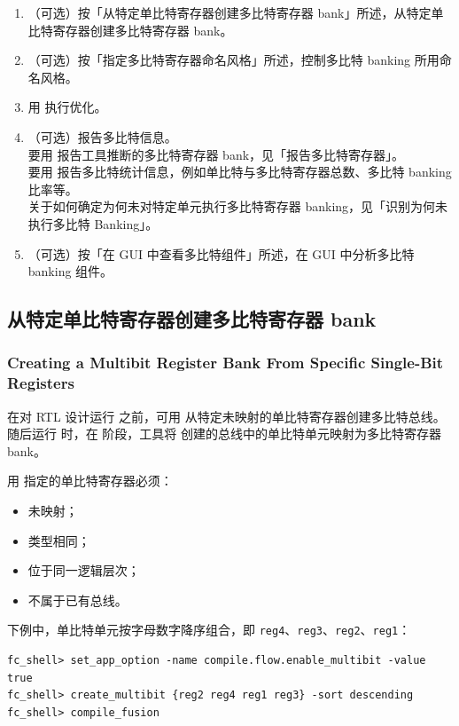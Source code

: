 \begin{enumerate}
  \item （可选）按「从特定单比特寄存器创建多比特寄存器 bank」所述，从特定单比特寄存器创建多比特寄存器 bank。
  \item （可选）按「指定多比特寄存器命名风格」所述，控制多比特 banking 所用命名风格。
  \item 用  执行优化。
  \item （可选）报告多比特信息。\\
    要用  报告工具推断的多比特寄存器 bank，见「报告多比特寄存器」。\\
    要用  报告多比特统计信息，例如单比特与多比特寄存器总数、多比特 banking 比率等。\\
    关于如何确定为何未对特定单元执行多比特寄存器 banking，见「识别为何未执行多比特 Banking」。
  \item （可选）按「在 GUI 中查看多比特组件」所述，在 GUI 中分析多比特 banking 组件。
\end{enumerate}

\subsection{从特定单比特寄存器创建多比特寄存器 bank}
\subsubsection*{Creating a Multibit Register Bank From Specific Single-Bit Registers}

在对 RTL 设计运行  之前，可用  从特定未映射的单比特寄存器创建多比特总线。随后运行  时，在  阶段，工具将  创建的总线中的单比特单元映射为多比特寄存器 bank。

用  指定的单比特寄存器必须：
\begin{itemize}
  \item 未映射；
  \item 类型相同；
  \item 位于同一逻辑层次；
  \item 不属于已有总线。
\end{itemize}

下例中，单比特单元按字母数字降序组合，即 \texttt{reg4}、\texttt{reg3}、\texttt{reg2}、\texttt{reg1}：
\begin{lstlisting}
fc_shell> set_app_option -name compile.flow.enable_multibit -value true
fc_shell> create_multibit {reg2 reg4 reg1 reg3} -sort descending
fc_shell> compile_fusion
\end{lstlisting}

